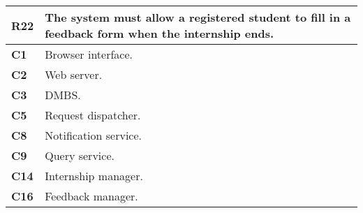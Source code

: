 \begin{table}[H]
    \centering
    \begin{tabular}{|l|m{10cm}|}
        \hline \textbf{R22} & The system must allow a registered student to fill in a feedback form when the internship ends.\\
        \hline \textbf{C1} & Browser interface. \\
        \hline \textbf{C2} & Web server. \\
        \hline \textbf{C3} & DMBS. \\
        \hline \textbf{C5} & Request dispatcher. \\
        \hline \textbf{C8} & Notification service. \\
        \hline \textbf{C9} & Query service. \\
        \hline \textbf{C14} & Internship manager. \\
        \hline \textbf{C16} & Feedback manager. \\
        \hline
    \end{tabular}
\end{table}

